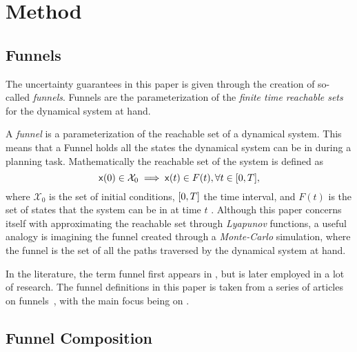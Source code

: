 \section{Method}

\subsection{Funnels}
\label{sec:funnels}

The uncertainty guarantees in this paper is given through the creation of
so-called \textit{funnels}. Funnels are the parameterization of the
\textit{finite time reachable sets} for the dynamical system at hand.

A \textit{funnel} is a parameterization of the reachable set of a dynamical
system. This means that a Funnel holds all the states the dynamical system can
be in during a planning task. Mathematically the reachable set of the system is
defined as
\[
  {\mathbf{\mathsf{x}}}(0) \in \mathcal{X}_0 \implies {\mathbf{\mathsf{x}}}(t) \in F(t), \forall t \in
  \lbrack0,T\rbrack,
\]
where \(\mathcal{X}_0\) is the set of initial conditions, \(\lbrack0,T\rbrack\) the time
interval, and \(F(t)\) is the set of states that the system can be in at time
\(t\) \cite{majumdarFunnelLibrariesRealtime2017}. Although this paper concerns
itself with approximating the reachable set through \textit{Lyapunov} functions,
a useful analogy is imagining the funnel created through a \textit{Monte-Carlo}
simulation, where the funnel is the set of all the paths traversed by the
dynamical system at hand.

In the literature, the term funnel first appears in
\cite{masonMechanicsManipulation1985}, but is later employed in a lot of
research. The funnel definitions in this paper is taken from a series of
articles on funnels~\cite{Tobenkin_2011,tedrakeLQRtreesFeedbackMotion2009,
  majumdarRobustOnlineMotion2013,
  majumdarFunnelLibrariesRealtime2017,ahmadi2014dsos}, with the main focus being
on \cite{majumdarFunnelLibrariesRealtime2017}.


\subsection{Funnel Composition}

